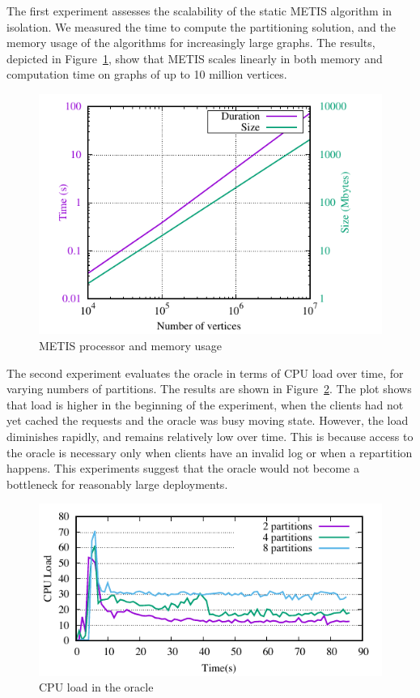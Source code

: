 The first experiment assesses the scalability of the static METIS algorithm
in isolation. We measured the time to compute the partitioning solution, and
the memory usage of the algorithms for increasingly large graphs. 
The results, depicted in Figure~\ref{fig:metis_size_time}, show that METIS scales
linearly in both memory and computation time on graphs of up to 10 million vertices.


\begin{figure}[ht!]
  \centering
    \includegraphics[width=\columnwidth]{figures/metis_size_time}
	\caption{METIS processor and memory usage}
	\label{fig:metis_size_time}
\end{figure}

The second experiment evaluates the oracle in terms of CPU load over
time, for varying numbers of partitions. The results are shown in
Figure~\ref{fig:cpu_oracle}. The plot shows that load is higher in the
beginning of the experiment, when the clients had not yet cached the
requests and the oracle was busy moving state. However, the load diminishes rapidly, and remains relatively
low over time. This is because access to the oracle is necessary only
when clients have an invalid log or when a repartition happens. This experiments
suggest that the oracle would not become a bottleneck for reasonably large
deployments.

\begin{figure}[ht]
	\includegraphics{figures/experiments/oracle-load}
	\caption{CPU load in the oracle}
	\label{fig:cpu_oracle}
\end{figure}

